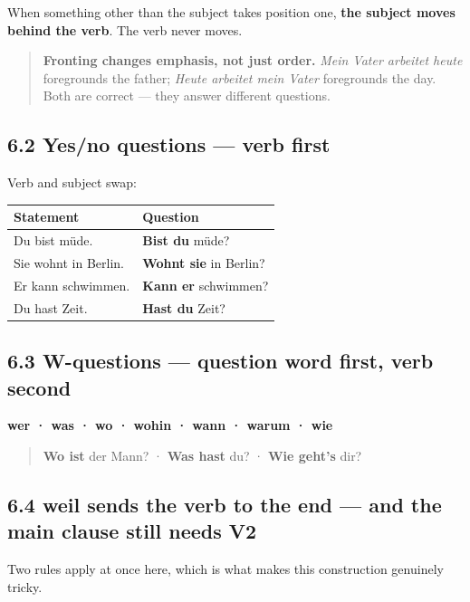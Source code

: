\documentclass[
  11pt,
]{article}
\newcounter{none} %
\begin{document}
When something other than the subject takes position one, \textbf{the
subject moves behind the verb}. The verb never moves.

\begin{quote}
\textbf{Fronting changes emphasis, not just order.} \emph{Mein Vater
arbeitet heute} foregrounds the father; \emph{Heute arbeitet mein Vater}
foregrounds the day. Both are correct --- they answer different
questions.
\end{quote}

\subsection{6.2 Yes/no questions --- verb
first}\label{yesno-questions-verb-first}

Verb and subject swap:

{\def\LTcaptype{none} %
\begin{longtable}[]{@{}ll@{}}
\toprule\noalign{}
Statement & Question \\
\midrule\noalign{}
\endhead
\bottomrule\noalign{}
\endlastfoot
Du bist müde. & \textbf{Bist du} müde? \\
Sie wohnt in Berlin. & \textbf{Wohnt sie} in Berlin? \\
Er kann schwimmen. & \textbf{Kann er} schwimmen? \\
Du hast Zeit. & \textbf{Hast du} Zeit? \\
\end{longtable}
}

\subsection{6.3 W-questions --- question word first, verb
second}\label{w-questions-question-word-first-verb-second}

\textbf{wer · was · wo · wohin · wann · warum · wie}

\begin{quote}
\textbf{Wo ist} der Mann? · \textbf{Was hast} du? · \textbf{Wie geht's}
dir?
\end{quote}

\subsection{6.4 weil sends the verb to the end --- and the main clause
still needs
V2}\label{weil-sends-the-verb-to-the-end-and-the-main-clause-still-needs-v2}

Two rules apply at once here, which is what makes this construction
genuinely tricky.
\end{document}
